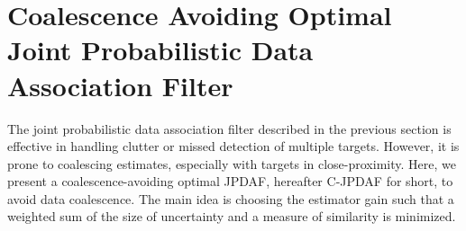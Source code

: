 \documentclass[letterpaper, 10pt, conference]{ieeeconf}
\newcommand{\bracket}[1]{\ensuremath{\left[ #1 \right]}}
\newcommand{\tr}[1]{\mathrm{tr}\ensuremath{\negthickspace\bracket{#1}}}
\newcommand{\EditTL}[1]{{\color{red}\protect #1}}
\renewcommand{\EditTL}[1]{{\protect #1}}
\begin{document}



\section{Coalescence Avoiding Optimal Joint Probabilistic Data Association Filter}%
\label{C-JPDAF}

The joint probabilistic data association filter described in the previous section is effective in handling clutter or missed detection of multiple targets. However, it is prone to coalescing estimates, especially with targets in close-proximity. Here, we present a coalescence-avoiding optimal JPDAF, hereafter C-JPDAF for short, to avoid data coalescence. The main idea is choosing the estimator gain such that a weighted sum of the size of uncertainty and a measure of similarity is minimized. 
\end{document}
